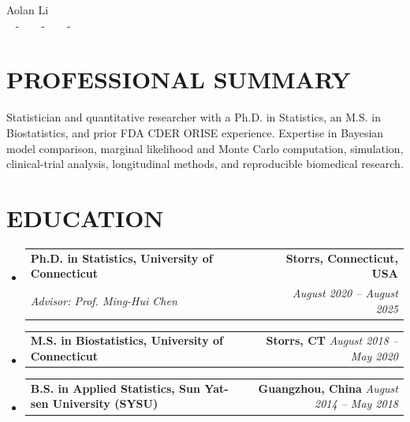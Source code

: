 \documentclass[letterpaper,11pt]{article}
\makeatletter
\newcommand{\educationSubheading}[4]{
  \item
    \begin{tabular*}{1.0\textwidth}[t]{l@{\extracolsep{\fill}}r}
      \textbf{\large #1} & \textbf{\small #2} \\
      \textit{\large #3} & \textit{\small #4} \\[1pt]
    \end{tabular*}\vspace{-2pt}
}
\newcommand{\educationSingleLine}[3]{
  \item
    \begin{tabular*}{1.0\textwidth}[t]{l@{\extracolsep{\fill}}r}
      \textbf{\large #1} & \textbf{\small #2} \quad \textit{\small #3} \\[2pt]
    \end{tabular*}\vspace{-2pt}
}
\newcommand{\resumeSubHeadingListStart}{\begin{itemize}[leftmargin=0.0in, label={}]}
\newcommand{\resumeSubHeadingListEnd}{\end{itemize}}
\makeatother
\begin{document}
\begin{center}
    {\huge Aolan Li} \\ \vspace{2pt}
    \href{mailto:aolan.li@yale.edu}{\color{blue}{aolan.li@yale.edu}} ~
    \small{-} ~
    \href{https://scholar.google.com/citations?user=Ll702C4AAAAJ}{\color{blue}{Google Scholar}} ~
    \small{-} ~
    \href{https://orcid.org/0009-0009-3525-395X}{\color{blue}{ORCID}} ~
    \small{-} ~
    \href{https://aolanli.github.io/}{\color{blue}{Personal Website}}
    \vspace{-7pt}
\end{center}

\section{PROFESSIONAL SUMMARY}
\small{Statistician and quantitative researcher with a Ph.D. in Statistics, an M.S. in Biostatistics, and prior FDA CDER ORISE experience. Expertise in Bayesian model comparison, marginal likelihood and Monte Carlo computation, simulation, clinical-trial analysis, longitudinal methods, and reproducible biomedical research.}
\vspace{-7pt}

\section{EDUCATION}
\resumeSubHeadingListStart
  \educationSubheading
    {Ph.D. in Statistics, University of Connecticut}{Storrs, Connecticut, USA}
    {Advisor: Prof. Ming-Hui Chen}{August 2020 -- August 2025}
  \educationSingleLine
    {M.S. in Biostatistics, University of Connecticut}{Storrs, CT}{August 2018 -- May 2020}
  \educationSingleLine
    {B.S. in Applied Statistics, Sun Yat-sen University (SYSU)}{Guangzhou, China}{August 2014 -- May 2018}
\resumeSubHeadingListEnd
\vspace{-10pt}
\end{document}
